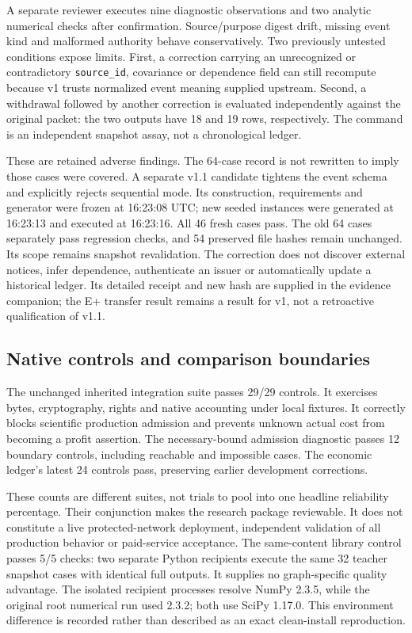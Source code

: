 \documentclass[11pt]{article}
\begin{document}
A separate reviewer executes nine diagnostic observations and two analytic numerical checks after confirmation. Source/purpose digest drift, missing event kind and malformed authority behave conservatively. Two previously untested conditions expose limits. First, a correction carrying an unrecognized or contradictory \texttt{source\_id}, covariance or dependence field can still recompute because v1 trusts normalized event meaning supplied upstream. Second, a withdrawal followed by another correction is evaluated independently against the original packet: the two outputs have 18 and 19 rows, respectively. The command is an independent snapshot assay, not a chronological ledger.

These are retained adverse findings. The 64-case record is not rewritten to imply those cases were covered. A separate v1.1 candidate tightens the event schema and explicitly rejects sequential mode. Its construction, requirements and generator were frozen at 16:23:08 UTC; new seeded instances were generated at 16:23:13 and executed at 16:23:16. All 46 fresh cases pass. The old 64 cases separately pass regression checks, and 54 preserved file hashes remain unchanged. Its scope remains snapshot revalidation. The correction does not discover external notices, infer dependence, authenticate an issuer or automatically update a historical ledger. Its detailed receipt and new hash are supplied in the evidence companion; the E+ transfer result remains a result for v1, not a retroactive qualification of v1.1.

\subsection{Native controls and comparison boundaries}

The unchanged inherited integration suite passes 29/29 controls. It exercises bytes, cryptography, rights and native accounting under local fixtures. It correctly blocks scientific production admission and prevents unknown actual cost from becoming a profit assertion. The necessary-bound admission diagnostic passes 12 boundary controls, including reachable and impossible cases. The economic ledger's latest 24 controls pass, preserving earlier development corrections.

These counts are different suites, not trials to pool into one headline reliability percentage. Their conjunction makes the research package reviewable. It does not constitute a live protected-network deployment, independent validation of all production behavior or paid-service acceptance. The same-content library control passes 5/5 checks: two separate Python recipients execute the same 32 teacher snapshot cases with identical full outputs. It supplies no graph-specific quality advantage. The isolated recipient processes resolve NumPy 2.3.5, while the original root numerical run used 2.3.2; both use SciPy 1.17.0. This environment difference is recorded rather than described as an exact clean-install reproduction.
\end{document}

